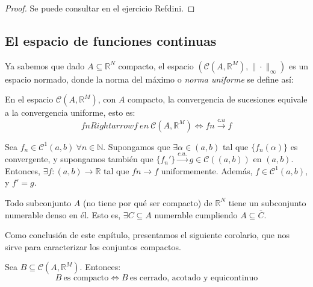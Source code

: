   \begin{proof}
    Se puede consultar en el ejercicio Ref{dini}.
  \end{proof}


\subsection{El espacio de funciones continuas}

Ya sabemos que dado $A\subseteq \mathbb{R}^N$ compacto, el espacio $(\mathcal{C}(A,\mathbb{R}^M), \|\cdot\|_{\infty})$
es un espacio normado, donde la norma del máximo o \textit{norma uniforme} se define así:


\begin{nprop} En el espacio $\mathcal{C}(A,\mathbb{R}^M)$, con $A$ compacto, la convergencia de sucesiones equivale a la convergencia uniforme, esto es: $$fn Rightarrow f\ en\ \mathcal{C}(A,\mathbb{R}^M) \iff fn \xrightarrow {c.u} f$$
\end{nprop}

  
\begin{ncor}
  Sea $f_n\in \mathcal{C}^1(a,b) \ \forall n \in \mathbb{N}$. Supongamos que $\exists \alpha \in (a,b)$ tal que $ \{f_n(\alpha)\}$ es convergente, y supongamos también que $\{f_n'\} \xrightarrow{c.u.} g \in \mathcal C((a,b))$ en $(a,b)$. Entonces, $\exists f: (a,b) \to \mathbb{R}$ tal que $fn \to f$ uniformemente. Además, $f \in \mathcal{C}^1(a,b)$, y  $f' = g$.
\end{ncor}

\begin{lema} \label{conjunto_denso}
  Todo subconjunto $A$ (no tiene por qué ser compacto) de
  $\mathbb{R}^N$ tiene un subconjunto numerable denso en \'el. Esto
  es, $\exists C \subseteq A$ numerable cumpliendo
  $A \subseteq \overline{C}$.
\end{lema}

Como conclusión de este capítulo, presentamos el siguiente corolario, que nos sirve para caracterizar los conjuntos compactos.

\begin{ncor} Sea $B \subseteq \mathcal{C}(A,\mathbb{R}^M)$. Entonces: $$B\ \text{es compacto} \iff B \ \text{es cerrado, acotado y equicontinuo}$$
\end{ncor}
